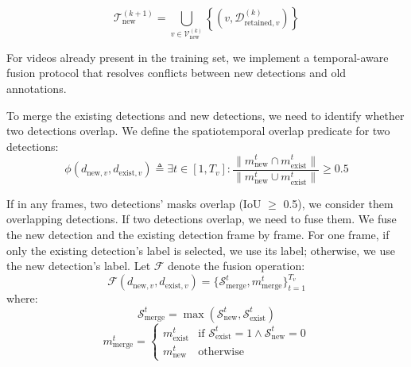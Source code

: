 \begin{equation}
\mathcal{T}_{\text{new}}^{(k+1)} =  \bigcup_{v \in \mathcal{V}_{\text{new}}^{(k)}} \left\{ \left(v, \mathcal{D}_{\text{retained},v}^{(k)} \right) \right\}
\end{equation}

For videos already present in the training set, we implement a temporal-aware fusion protocol that resolves conflicts between new detections and old annotations.

To merge the existing detections and new detections, we need to identify whether two detections overlap. We define the spatiotemporal overlap predicate for two detections:
\begin{equation}
    \phi(d_{\text{new}, v}, d_{\text{exist}, v}) \triangleq \exists t \in [1, T_v]: \frac{\|m_{\text{new}}^t \cap m_{\text{exist}}^t\|}{\|m_{\text{new}}^t \cup m_{\text{exist}}^t\|} \geq 0.5
\end{equation}

If in any frames, two detections' masks overlap (IoU $\geq$ 0.5), we consider them overlapping detections. If two detections overlap, we need to fuse them. We fuse the new detection and the existing detection frame by frame. For one frame, if only the existing detection's label is selected, we use its label; otherwise, we use the new detection's label. Let $\mathcal{F}$ denote the fusion operation:
\begin{equation}
    \mathcal{F}(d_{\text{new},v}, d_{\text{exist},v}) =  \{\mathcal{S}_{\text{merge}}^t, m_{\text{merge}}^t\}_{t=1}^{T_v}
\end{equation}
where:
\begin{equation}
    \mathcal{S}_{\text{merge}}^t = \max(\mathcal{S}_{\text{new}}^t, \mathcal{S}_{\text{exist}}^t)
\end{equation}
\begin{equation}
    m_{\text{merge}}^t = \begin{cases} 
m_{\text{exist}}^t & \text{if } \mathcal{S}_{\text{exist}}^t = 1 \land \mathcal{S}_{\text{new}}^t = 0 \\
m_{\text{new}}^t & \text{otherwise}
\end{cases}
\end{equation}

